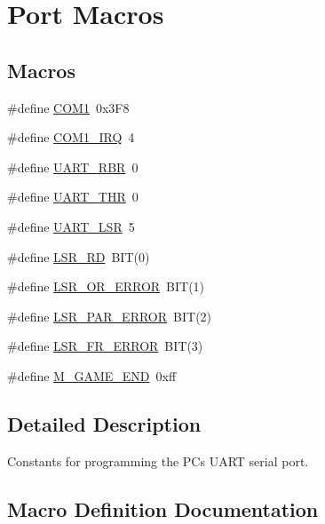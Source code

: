 \hypertarget{group__Serial}{}\section{Port Macros}
\label{group__Serial}
\subsection*{Macros}
\begin{DoxyCompactItemize}
\item 
\#define \hyperlink{group__Serial_ga00dbb3ab1c59e14699be9393693e2248}{C\+O\+M1}~0x3\+F8
\item 
\#define \hyperlink{group__Serial_ga3685c78b9bd6dd0fa3861807e24a4e1b}{C\+O\+M1\+\_\+\+I\+RQ}~4
\item 
\#define \hyperlink{group__Serial_ga3eb7d5a767dae7774aa2b4be28e20a7e}{U\+A\+R\+T\+\_\+\+R\+BR}~0
\item 
\#define \hyperlink{group__Serial_ga7a676f075475e46d27eb878977b867ec}{U\+A\+R\+T\+\_\+\+T\+HR}~0
\item 
\#define \hyperlink{group__Serial_ga0f8ac527073d763bac90daba987361c6}{U\+A\+R\+T\+\_\+\+L\+SR}~5
\item 
\#define \hyperlink{group__Serial_gaef6b74ebb13843a65360fd9150bfe60f}{L\+S\+R\+\_\+\+RD}~B\+IT(0)
\item 
\#define \hyperlink{group__Serial_gacf9e80fe020186ba32a5c3cb9c9f1048}{L\+S\+R\+\_\+\+O\+R\+\_\+\+E\+R\+R\+OR}~B\+IT(1)
\item 
\#define \hyperlink{group__Serial_gad44624d499dbaaf87bc41065facb7b44}{L\+S\+R\+\_\+\+P\+A\+R\+\_\+\+E\+R\+R\+OR}~B\+IT(2)
\item 
\#define \hyperlink{group__Serial_gacec4c93577a6bbca2ec5c3cebe0f38d8}{L\+S\+R\+\_\+\+F\+R\+\_\+\+E\+R\+R\+OR}~B\+IT(3)
\item 
\#define \hyperlink{group__Serial_gacd472a07fb4c0c9261c4eace493c679e}{M\+\_\+\+G\+A\+M\+E\+\_\+\+E\+ND}~0xff
\end{DoxyCompactItemize}


\subsection{Detailed Description}
Constants for programming the PC\textquotesingle{}s U\+A\+RT serial port. 

\subsection{Macro Definition Documentation}
\mbox{\label{group__Serial_ga00dbb3ab1c59e14699be9393693e2248}} 
